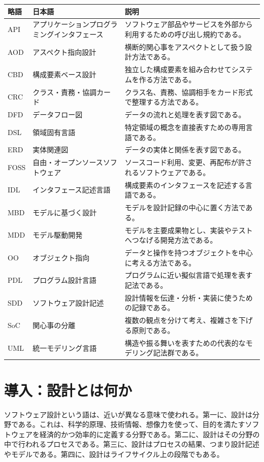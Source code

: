 \documentclass[10.5pt,a4paper]{ltjsarticle}
\begin{document}
\begin{tabularx}{\linewidth}{L{18mm}L{43mm}Y}
\toprule
\textbf{略語} & \textbf{日本語} & \textbf{説明} \\
\midrule
API & アプリケーションプログラミングインタフェース & ソフトウェア部品やサービスを外部から利用するための呼び出し規約である。 \\
AOD & アスペクト指向設計 & 横断的関心事をアスペクトとして扱う設計方法である。 \\
CBD & 構成要素ベース設計 & 独立した構成要素を組み合わせてシステムを作る方法である。 \\
CRC & クラス・責務・協調カード & クラス名、責務、協調相手をカード形式で整理する方法である。 \\
DFD & データフロー図 & データの流れと処理を表す図である。 \\
DSL & 領域固有言語 & 特定領域の概念を直接表すための専用言語である。 \\
ERD & 実体関連図 & データの実体と関係を表す図である。 \\
FOSS & 自由・オープンソースソフトウェア & ソースコード利用、変更、再配布が許されるソフトウェアである。 \\
IDL & インタフェース記述言語 & 構成要素のインタフェースを記述する言語である。 \\
MBD & モデルに基づく設計 & モデルを設計記録の中心に置く方法である。 \\
MDD & モデル駆動開発 & モデルを主要成果物とし、実装やテストへつなげる開発方法である。 \\
OO & オブジェクト指向 & データと操作を持つオブジェクトを中心に考える方法である。 \\
PDL & プログラム設計言語 & プログラムに近い擬似言語で処理を表す記法である。 \\
SDD & ソフトウェア設計記述 & 設計情報を伝達・分析・実装に使うための記録である。 \\
SoC & 関心事の分離 & 複数の観点を分けて考え、複雑さを下げる原則である。 \\
UML & 統一モデリング言語 & 構造や振る舞いを表すための代表的なモデリング記法群である。 \\
\bottomrule
\end{tabularx}

\section*{導入：設計とは何か}

ソフトウェア設計という語は、近いが異なる意味で使われる。第一に、設計は分野である。これは、科学的原理、技術情報、想像力を使って、目的を満たすソフトウェアを経済的かつ効率的に定義する分野である。第二に、設計はその分野の中で行われるプロセスである。第三に、設計はプロセスの結果、つまり設計記述やモデルである。第四に、設計はライフサイクル上の段階でもある。
\end{document}
